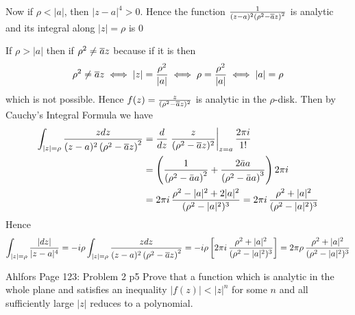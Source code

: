 \documentclass[a4paper, 11pt]{article}
\begin{document}
{\begin{itemize}
	Now if $\rho < |a|$, then $|z-a|^4>0$. Hence the function $\frac1{(z-a)^2\left(\rho^2-\overline{a} z\right)^2}$ is analytic and its integral  along $|z|=\rho$ is 0\parinn
	
	If $\rho > |a|$ then if $\rho^2\neq \overline{a} z$ because if it is then \begin{align*}
		\rho^2\neq \overline{a} z \iff |z| =\frac{\rho^2}{|a|} \iff \rho = \frac{\rho^2}{|a|} \iff |a|=\rho
	\end{align*} which is not possible. Hence $f(z)=\frac{z}{(\rho^2-\overline{a} z)^2}$ is analytic in the $\rho$-disk. Then by Cauchy's Integral Formula we have\begin{align*}
	\int_{|z|=\rho}\frac{zdz}{(z-a)^2\left(\rho^2-\overline{a} z\right)^2} & =\frac{d}{dz}\left. \frac{z}{(\rho^2-\overline{a} z)^2}\right|_{z=a} \frac{2\pi i}{1!}\\
	& = \left(\frac{1}{\left(\rho^2-\bar{a} a\right)^2}+\frac{2 \bar{a} a}{\left(\rho^2-\bar{a} a\right)^3}\right)  2 \pi i\\
	& = 2\pi i \, \frac{\rho^2-|a|^2+2|a|^2}{(\rho^2-|a|^2)^3}=2\pi i \, \frac{\rho^2+|a|^2}{(\rho^2-|a|^2)^3}
\end{align*}Hence $$	\int_{|z|=\rho}\frac{|dz|}{|z-a|^4}=-i\rho \int_{|z|=\rho}\frac{zdz}{(z-a)^2\left(\rho^2-\overline{a} z\right)^2}=-i\rho \left[ 2\pi i \, \frac{\rho^2+|a|^2}{(\rho^2-|a|^2)^3} \right]=2\pi\rho\, \frac{\rho^2+|a|^2}{(\rho^2-|a|^2)^3}$$
	\end{itemize}
	}
		
\pagebreak	
	\begin{problem}{%
			Ahlfors Page 123: Problem 2
		}{p5%
		}
		Prove that a function which is analytic in the whole plane and satisfies an inequality $|f(z)|<|z|^n$ for some $n$ and all sufficiently large $|z|$ reduces to a polynomial.
		
	\end{problem}
	
\end{document}
